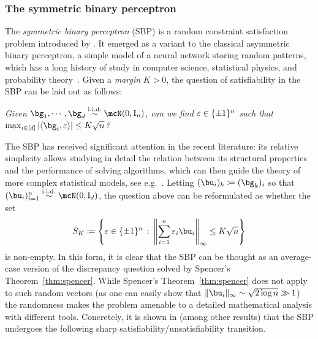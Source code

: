 \subsubsection{The symmetric binary perceptron}\label{subsubsec:sbp}

The \emph{symmetric binary perceptron} (SBP) is a random constraint satisfaction problem introduced by \cite{aubin2019storage}. 
It emerged as a variant to the classical asymmetric binary perceptron, 
a simple model of a neural network storing random patterns, which has a long history of study in 
computer science, statistical physics, and probability theory~\citep{cover1965geometrical,gardner1988space,gardner1988optimal,krauth1989storage,sompolinsky1990learning,talagrand1999intersecting,talagrand2010mean}.
Given a \emph{margin} $K > 0$, the question of satisfiability in the SBP can be laid out as follows:
\begin{center}
   \textit{
    Given $\bg_1, \cdots, \bg_d \iid \mcN(0, \Id_n)$, can we find $\varepsilon \in \{\pm 1\}^n$ 
    such that $\max_{i \in [d]}|\langle \bg_i, \eps \rangle| \leq K \sqrt{n}$? 
   }
\end{center}
The SBP has received significant attention in the recent literature:
its relative simplicity allows studying in detail the relation between its structural properties and the performance of 
solving algorithms, 
which can then guide the theory of more complex statistical models,
see e.g.\ \cite{aubin2019storage,perkins2021frozen,abbe2022proof,gamarnik2022algorithms,kizildag2023symmetric,barbier2024atypical,alaoui2024hardness,barbier2024escape}.
Letting $(\bu_i)_k \coloneqq (\bg_k)_i$ so that $(\bu_i)_{i=1}^n \iid \mcN(0, \Id_d)$, the question above can be reformulated 
as whether the set 
\begin{equation}
    \label{eq:def_SK_SBP}
    S_K \coloneqq \left\{\eps \in \{\pm 1\}^n \, : \, \left\|\sum_{i=1}^n \eps_i \bu_i \right\|_\infty \leq K \sqrt{n}\right\}
\end{equation}
is non-empty.
In this form, it is clear that the SBP can be thought as an average-case version of the discrepancy question solved by Spencer's Theorem~\ref{thm:spencer}. 
While Spencer's Theorem~\ref{thm:spencer} does not apply to such random vectors (as one can easily show that $\|\bu_i\|_\infty \sim \sqrt{2 \log n} \gg 1$)
the randomness makes the problem amenable to a detailed mathematical analysis with different tools.
Concretely, it is shown in \cite{aubin2019storage,abbe2022proof,gamarnik2022algorithms} (among other results) that 
the SBP undergoes the following sharp satisfiability/unsatisfiability transition.
